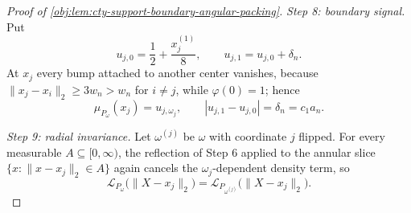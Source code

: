 \begin{proof}[Proof of \cref{obj:lem:cty-support-boundary-angular-packing}]
\emph{Step 8: boundary signal.}  Put
\[
u_{j,0}=\frac12+\frac{x_j^{(1)}}{8},
\qquad
u_{j,1}=u_{j,0}+\delta_n .
\]
At \(x_j\) every bump attached to another center vanishes, because \(\lVert x_j-x_i\rVert_2\ge3w_n>w_n\) for \(i\ne j\), while \(\varphi(0)=1\); hence
\[
\mu_{P_\omega}(x_j)=u_{j,\omega_j},
\qquad
|u_{j,1}-u_{j,0}|=\delta_n=c_1a_n .
\]

\emph{Step 9: radial invariance.}  Let \(\omega^{(j)}\) be \(\omega\) with coordinate \(j\) flipped.  For every measurable \(A\subseteq[0,\infty)\), the reflection of Step 6 applied to the annular slice \(\{x:\lVert x-x_j\rVert_2\in A\}\) again cancels the \(\omega_j\)-dependent density term, so
\[
\mathcal L_{P_\omega}\bigl(\lVert X-x_j\rVert_2\bigr)
=
\mathcal L_{P_{\omega^{(j)}}}\bigl(\lVert X-x_j\rVert_2\bigr).
\]


\end{proof}
